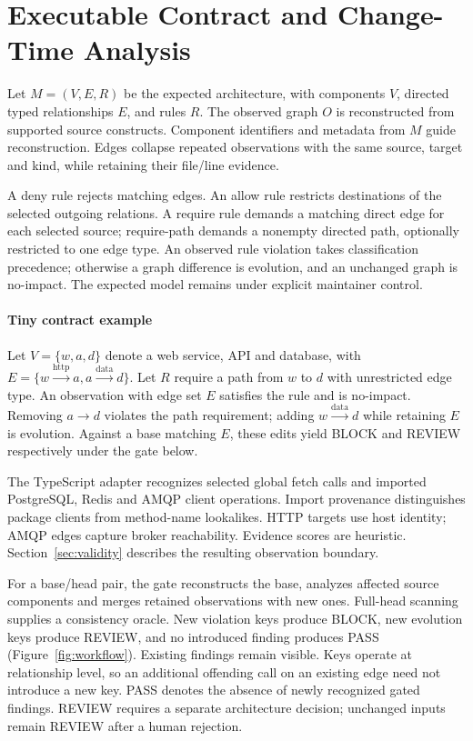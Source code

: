 

\section{Executable Contract and Change-Time Analysis}
Let $M=(V,E,R)$ be the expected architecture, with components $V$, directed typed relationships $E$, and rules $R$. The observed graph $O$ is reconstructed from supported source constructs. Component identifiers and metadata from $M$ guide reconstruction. Edges collapse repeated observations with the same source, target and kind, while retaining their file/line evidence.

A deny rule rejects matching edges. An allow rule restricts destinations of the selected outgoing relations. A require rule demands a matching direct edge for each selected source; require-path demands a nonempty directed path, optionally restricted to one edge type. An observed rule violation takes classification precedence; otherwise a graph difference is evolution, and an unchanged graph is no-impact. The expected model remains under explicit maintainer control.

\paragraph{Tiny contract example} Let $V=\{w,a,d\}$ denote a web service, API and database, with $E=\{w\xrightarrow{\mathrm{http}}a, a\xrightarrow{\mathrm{data}}d\}$. Let $R$ require a path from $w$ to $d$ with unrestricted edge type. An observation with edge set $E$ satisfies the rule and is no-impact. Removing $a\to d$ violates the path requirement; adding $w\xrightarrow{\mathrm{data}}d$ while retaining $E$ is evolution. Against a base matching $E$, these edits yield BLOCK and REVIEW respectively under the gate below.

The TypeScript adapter recognizes selected global fetch calls and imported PostgreSQL, Redis and AMQP client operations. Import provenance distinguishes package clients from method-name lookalikes. HTTP targets use host identity; AMQP edges capture broker reachability. Evidence scores are heuristic. Section~\ref{sec:validity} describes the resulting observation boundary.

For a base/head pair, the gate reconstructs the base, analyzes affected source components and merges retained observations with new ones. Full-head scanning supplies a consistency oracle. New violation keys produce BLOCK, new evolution keys produce REVIEW, and no introduced finding produces PASS (Figure~\ref{fig:workflow}). Existing findings remain visible. Keys operate at relationship level, so an additional offending call on an existing edge need not introduce a new key. PASS denotes the absence of newly recognized gated findings. REVIEW requires a separate architecture decision; unchanged inputs remain REVIEW after a human rejection.

